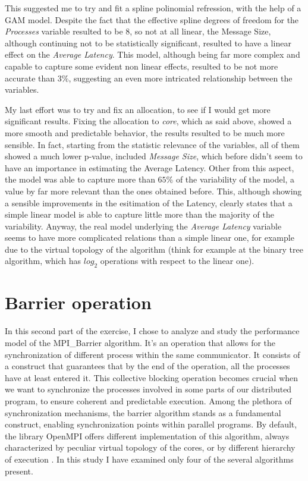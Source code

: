 \documentclass{article}
\begin{document}
	
	
	This suggested me to try and fit a spline polinomial refression, with the help of a GAM model. Despite the fact that the effective spline degrees of freedom for the \textit{Processes} variable resulted to be 8, so not at all linear, the Message Size, although continuing not to be statistically significant, resulted to have a linear effect on the \textit{Average Latency}.
	This model, although being far more complex and capable to capture some evident non linear  effects, resulted to be not more accurate than $3\%$, suggesting an even more intricated relationship between the variables.
	
	
	
	My last effort was to try and fix an allocation, to see if I would get more significant results.
	Fixing the allocation to \textit{core}, which as said above, showed a more smooth and predictable behavior, the results resulted to be much more sensible.
	In fact, starting from the statistic relevance of the variables, all of them showed a much lower p-value, included \textit{Message Size}, which before didn't seem to have an importance in estimating the Average Latency.
	Other from this aspect, the model was able to capture more than $65\%$ of the variability of the model, a value by far more relevant than the ones obtained before. This, although showing a sensible improvements in the esitimation of the Latency, clearly states that a simple linear model is able to capture little more than the majority of the variability. Anyway, the real model underlying the \textit{Average Latency} variable seems to have more complicated relations than a simple linear one, for example due to the virtual topology of the algorithm (think for example at the binary tree algorithm, which has $log_2$ operations with respect to the linear one).
	
	
	
	
	
	\section{Barrier operation}
	
	In this second part of the exercise, I chose to analyze and study the performance model of the MPI\_Barrier algorithm. It's an operation that allows for the synchronization of different process within the same communicator. It consists of a construct that guarantees that by the end of the operation, all the processes have at least entered it.
	This collective blocking operation becomes crucial when we want to synchronize the processes involved in some parts of our distributed program, to ensure coherent and predictable execution. Among the plethora of synchronization mechanisms, the barrier algorithm stands as a fundamental construct, enabling synchronization points within parallel programs.
	By default, the library OpenMPI offers different implementation of this algorithm, always characterized by peculiar virtual topology of the cores, or by different hierarchy of execution \cite{barrier_article}. In this study I have examined only four of the  several algorithms present.
	
\end{document}
